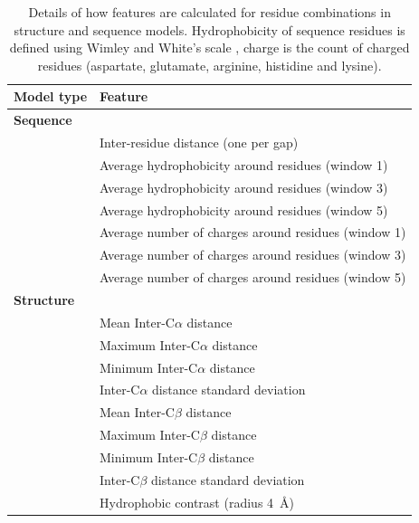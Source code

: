 \begin{table}
  \caption[Feature generation.]{\label{tab:features}Details of how features are calculated
    for residue combinations in structure and sequence models.
    Hydrophobicity of sequence residues is defined using Wimley and
    White's scale \protect\cite{wimley:hphob}, charge is the count of
    charged residues (aspartate, glutamate, arginine, histidine and
    lysine).}
\begin{center}
\begin{tabular}{ll} \hline
Model type            &  Feature                                              \\ \hline
{\bfseries Sequence}  &                                                       \\
                      &  Inter-residue distance (one per gap)                 \\
                      &  Average hydrophobicity around residues (window 1)    \\            
                      &  Average hydrophobicity around residues (window 3)    \\
                      &  Average hydrophobicity around residues (window 5)    \\
                      &  Average number of charges around residues (window 1) \\
                      &  Average number of charges around residues (window 3) \\
                      &  Average number of charges around residues (window 5) \\
{\bfseries Structure} &                                                       \\
                      &  Mean Inter-C$\alpha$ distance                        \\
                      &  Maximum Inter-C$\alpha$ distance                     \\
                      &  Minimum Inter-C$\alpha$ distance                     \\
                      &  Inter-C$\alpha$ distance standard deviation          \\
                      &  Mean Inter-C$\beta$ distance                         \\
                      &  Maximum Inter-C$\beta$ distance                      \\
                      &  Minimum Inter-C$\beta$ distance                      \\
                      &  Inter-C$\beta$ distance standard deviation           \\
                      &  Hydrophobic contrast (radius 4~{\AA})                \\ \hline
\end{tabular}
\end{center}
\end{table}

